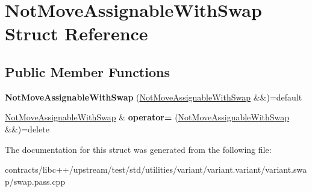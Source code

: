 \hypertarget{struct_not_move_assignable_with_swap}{}\section{Not\+Move\+Assignable\+With\+Swap Struct Reference}
\label{struct_not_move_assignable_with_swap}
\subsection*{Public Member Functions}
\begin{DoxyCompactItemize}
\item 
\mbox{\label{struct_not_move_assignable_with_swap_a10a8221bccb530dca8caabcf024fc9e7}} 
{\bfseries Not\+Move\+Assignable\+With\+Swap} (\mbox{\hyperlink{struct_not_move_assignable_with_swap}{Not\+Move\+Assignable\+With\+Swap}} \&\&)=default
\item 
\mbox{\label{struct_not_move_assignable_with_swap_afa9a0bad40035f1e512e4659e2472543}} 
\mbox{\hyperlink{struct_not_move_assignable_with_swap}{Not\+Move\+Assignable\+With\+Swap}} \& {\bfseries operator=} (\mbox{\hyperlink{struct_not_move_assignable_with_swap}{Not\+Move\+Assignable\+With\+Swap}} \&\&)=delete
\end{DoxyCompactItemize}


The documentation for this struct was generated from the following file\+:\begin{DoxyCompactItemize}
\item 
contracts/libc++/upstream/test/std/utilities/variant/variant.\+variant/variant.\+swap/swap.\+pass.\+cpp\end{DoxyCompactItemize}
